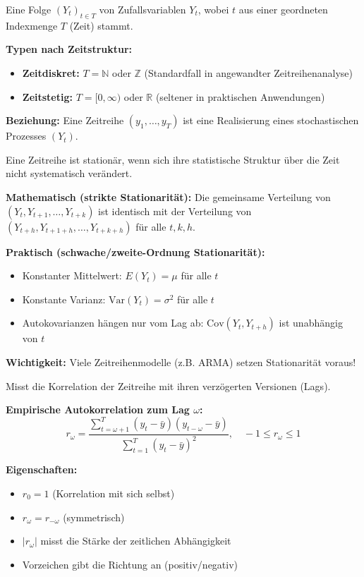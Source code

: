 Eine Folge $(Y_t)_{t \in T}$ von Zufallsvariablen $Y_t$, wobei $t$ aus einer geordneten Indexmenge $T$ (Zeit) stammt.

\textbf{Typen nach Zeitstruktur:}
\begin{itemize}[leftmargin=1.5em]
    \item \textbf{Zeitdiskret:} $T = \mathbb{N}$ oder $\mathbb{Z}$ (Standardfall in angewandter Zeitreihenanalyse)
    \item \textbf{Zeitstetig:} $T = [0, \infty)$ oder $\mathbb{R}$ (seltener in praktischen Anwendungen)
\end{itemize}

\textbf{Beziehung:} Eine Zeitreihe $(y_1, \ldots, y_T)$ ist eine Realisierung eines stochastischen Prozesses $(Y_t)$.

Eine Zeitreihe ist stationär, wenn sich ihre statistische Struktur über die Zeit nicht systematisch verändert.

\textbf{Mathematisch (strikte Stationarität):}
Die gemeinsame Verteilung von $(Y_t, Y_{t+1}, \ldots, Y_{t+k})$ ist identisch mit der Verteilung von $(Y_{t+h}, Y_{t+1+h}, \ldots, Y_{t+k+h})$ für alle $t, k, h$.

\textbf{Praktisch (schwache/zweite-Ordnung Stationarität):}
\begin{itemize}[leftmargin=1.5em]
    \item Konstanter Mittelwert: $E(Y_t) = \mu$ für alle $t$
    \item Konstante Varianz: $\text{Var}(Y_t) = \sigma^2$ für alle $t$
    \item Autokovarianzen hängen nur vom Lag ab: $\text{Cov}(Y_t, Y_{t+h})$ ist unabhängig von $t$
\end{itemize}

\textbf{Wichtigkeit:} Viele Zeitreihenmodelle (z.B. ARMA) setzen Stationarität voraus!

Misst die Korrelation der Zeitreihe mit ihren verzögerten Versionen (Lags).

\textbf{Empirische Autokorrelation zum Lag $\omega$:}
$$r_\omega = \frac{\sum_{t=\omega+1}^{T} (y_t - \bar{y})(y_{t-\omega} - \bar{y})}{\sum_{t=1}^{T} (y_t - \bar{y})^2}, \quad -1 \leq r_\omega \leq 1$$

\textbf{Eigenschaften:}
\begin{itemize}[leftmargin=1.5em]
    \item $r_0 = 1$ (Korrelation mit sich selbst)
    \item $r_\omega = r_{-\omega}$ (symmetrisch)
    \item $|r_\omega|$ misst die Stärke der zeitlichen Abhängigkeit
    \item Vorzeichen gibt die Richtung an (positiv/negativ)
\end{itemize}


